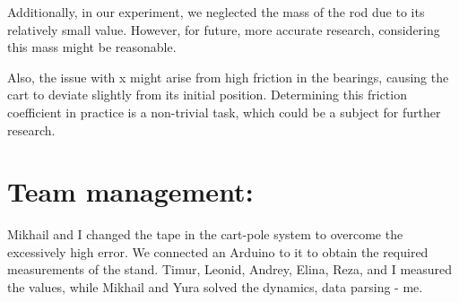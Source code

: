 \documentclass{article}
\begin{document}
Additionally, in our experiment, we neglected the mass of the rod due to its relatively small value. However, for future, more accurate research, considering this mass might be reasonable.

Also, the issue with x might arise from high friction in the bearings, causing the cart to deviate slightly from its initial position. Determining this friction coefficient in practice is a non-trivial task, which could be a subject for further research.

\section{Team management:} Mikhail and I changed the tape in the cart-pole system to overcome the excessively high error. We connected an Arduino to it to obtain the required measurements of the stand. Timur, Leonid, Andrey, Elina, Reza, and I measured the values, while Mikhail and Yura solved the dynamics, data parsing - me.
\end{document}
